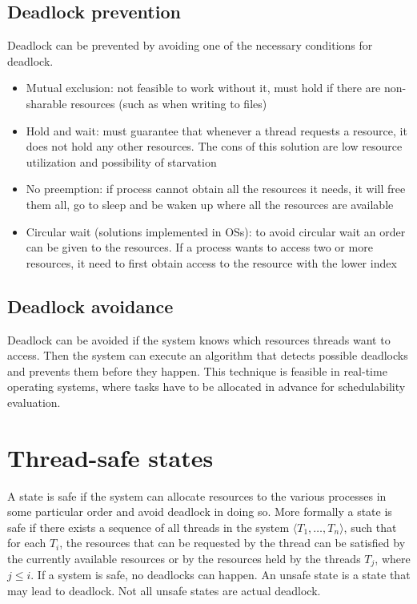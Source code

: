 
\subsection{Deadlock prevention}
Deadlock can be prevented by avoiding one of the necessary conditions for deadlock.
\begin{itemize}
    \item Mutual exclusion: not feasible to work without it, must hold if there are non-sharable resources (such as when writing to files)
    \item Hold and wait: must guarantee that whenever a thread requests a resource, it does not hold any other resources. The cons of this solution are low resource utilization and possibility of starvation
    \item No preemption: if process cannot obtain all the resources it needs, it will free them all, go to sleep and be waken up where all the resources are available
    \item Circular wait (solutions implemented in OSs): to avoid circular wait an order can be given to the resources. If a process wants to access two or more resources, it need to first obtain access to the resource with the lower index
\end{itemize}

\subsection{Deadlock avoidance}
Deadlock can be avoided if the system knows which resources threads want to access. Then the system can execute an algorithm that detects possible deadlocks and prevents them before they happen. This technique is feasible in real-time operating systems, where tasks have to be allocated in advance for schedulability evaluation.

\section{Thread-safe states}
A state is safe if the system can allocate resources to the various processes in some particular order and avoid deadlock in doing so. More formally a state is safe if there exists a sequence of all threads in the system $\langle T_1, \dots, T_n \rangle$, such that for each $T_i$, the resources that can be requested by the thread can be satisfied by the currently available resources or by the resources held by the threads $T_j$, where $j \le i$. If a system is safe, no deadlocks can happen. An unsafe state is a state that may lead to deadlock. Not all unsafe states are actual deadlock.

